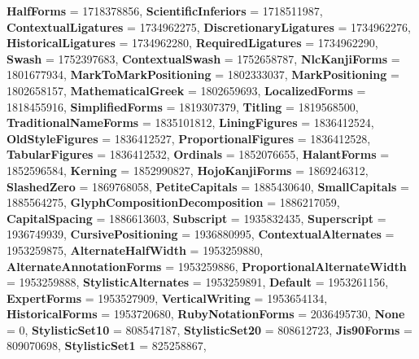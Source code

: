 \begin{DoxyCompactItemize}
{\bfseries Half\+Forms} = 1718378856, 
{\bfseries Scientific\+Inferiors} = 1718511987, 
{\bfseries Contextual\+Ligatures} = 1734962275, 
{\bfseries Discretionary\+Ligatures} = 1734962276, 
\newline
{\bfseries Historical\+Ligatures} = 1734962280, 
{\bfseries Required\+Ligatures} = 1734962290, 
{\bfseries Swash} = 1752397683, 
{\bfseries Contextual\+Swash} = 1752658787, 
\newline
{\bfseries Nlc\+Kanji\+Forms} = 1801677934, 
{\bfseries Mark\+To\+Mark\+Positioning} = 1802333037, 
{\bfseries Mark\+Positioning} = 1802658157, 
{\bfseries Mathematical\+Greek} = 1802659693, 
\newline
{\bfseries Localized\+Forms} = 1818455916, 
{\bfseries Simplified\+Forms} = 1819307379, 
{\bfseries Titling} = 1819568500, 
{\bfseries Traditional\+Name\+Forms} = 1835101812, 
\newline
{\bfseries Lining\+Figures} = 1836412524, 
{\bfseries Old\+Style\+Figures} = 1836412527, 
{\bfseries Proportional\+Figures} = 1836412528, 
{\bfseries Tabular\+Figures} = 1836412532, 
\newline
{\bfseries Ordinals} = 1852076655, 
{\bfseries Halant\+Forms} = 1852596584, 
{\bfseries Kerning} = 1852990827, 
{\bfseries Hojo\+Kanji\+Forms} = 1869246312, 
\newline
{\bfseries Slashed\+Zero} = 1869768058, 
{\bfseries Petite\+Capitals} = 1885430640, 
{\bfseries Small\+Capitals} = 1885564275, 
{\bfseries Glyph\+Composition\+Decomposition} = 1886217059, 
\newline
{\bfseries Capital\+Spacing} = 1886613603, 
{\bfseries Subscript} = 1935832435, 
{\bfseries Superscript} = 1936749939, 
{\bfseries Cursive\+Positioning} = 1936880995, 
\newline
{\bfseries Contextual\+Alternates} = 1953259875, 
{\bfseries Alternate\+Half\+Width} = 1953259880, 
{\bfseries Alternate\+Annotation\+Forms} = 1953259886, 
{\bfseries Proportional\+Alternate\+Width} = 1953259888, 
\newline
{\bfseries Stylistic\+Alternates} = 1953259891, 
{\bfseries Default} = 1953261156, 
{\bfseries Expert\+Forms} = 1953527909, 
{\bfseries Vertical\+Writing} = 1953654134, 
\newline
{\bfseries Historical\+Forms} = 1953720680, 
{\bfseries Ruby\+Notation\+Forms} = 2036495730, 
{\bfseries None} = 0, 
{\bfseries Stylistic\+Set10} = 808547187, 
\newline
{\bfseries Stylistic\+Set20} = 808612723, 
{\bfseries Jis90\+Forms} = 809070698, 
{\bfseries Stylistic\+Set1} = 825258867, 

\end{DoxyCompactItemize}

